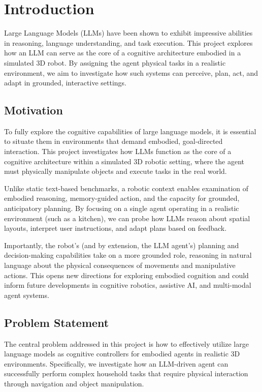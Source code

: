 \documentclass[../report.tex]{subfiles}
\begin{document}
\section{Introduction}
\label{sec:introduction}

Large Language Models (LLMs) have been shown to exhibit impressive abilities in reasoning, language understanding, and task execution. This project explores how an LLM can serve as the core of a cognitive architecture embodied in a simulated 3D robot. By assigning the agent physical tasks in a realistic environment, we aim to investigate how such systems can perceive, plan, act, and adapt in grounded, interactive settings.

\subsection{Motivation}
\label{sec:introduction:motivation}

To fully explore the cognitive capabilities of large language models, it is essential to situate them in environments that demand embodied, goal-directed interaction. This project investigates how LLMs function as the core of a cognitive architecture within a simulated 3D robotic setting, where the agent must physically manipulate objects and execute tasks in the real world.

Unlike static text-based benchmarks, a robotic context enables examination of embodied reasoning, memory-guided action, and the capacity for grounded, anticipatory planning. By focusing on a single agent operating in a realistic environment (such as a kitchen), we can probe how LLMs reason about spatial layouts, interpret user instructions, and adapt plans based on feedback.

Importantly, the robot's (and by extension, the LLM agent's) planning and decision-making capabilities take on a more grounded role, reasoning in natural language about the physical consequences of movements and manipulative actions. This opens new directions for exploring embodied cognition and could inform future developments in cognitive robotics, assistive AI, and multi-modal agent systems.

\subsection{Problem Statement}
\label{sec:introduction:problem_statement}

The central problem addressed in this project is how to effectively utilize large language models as cognitive controllers for embodied agents in realistic 3D environments. Specifically, we investigate how an LLM-driven agent can successfully perform complex household tasks that require physical interaction through navigation and object manipulation.
\end{document}
